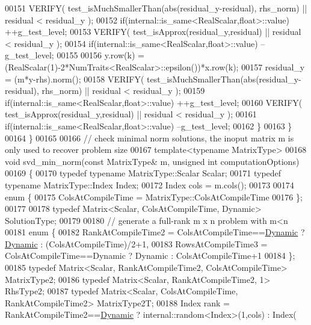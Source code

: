 \begin{DoxyCode}
00151       VERIFY( test\_isMuchSmallerThan(abs(residual\_y-residual), rhs\_norm) || residual < residual\_y );
00152       \textcolor{keywordflow}{if}(internal::is\_same<RealScalar,float>::value) ++g\_test\_level;
00153       VERIFY( test\_isApprox(residual\_y,residual) || residual < residual\_y );
00154       \textcolor{keywordflow}{if}(internal::is\_same<RealScalar,float>::value) --g\_test\_level;
00155       
00156       y.row(k) = (RealScalar(1)-2*NumTraits<RealScalar>::epsilon())*x.row(k);
00157       residual\_y = (m*y-rhs).norm();
00158       VERIFY( test\_isMuchSmallerThan(abs(residual\_y-residual), rhs\_norm) || residual < residual\_y );
00159       \textcolor{keywordflow}{if}(internal::is\_same<RealScalar,float>::value) ++g\_test\_level;
00160       VERIFY( test\_isApprox(residual\_y,residual) || residual < residual\_y );
00161       \textcolor{keywordflow}{if}(internal::is\_same<RealScalar,float>::value) --g\_test\_level;
00162     \}
00163   \}
00164 \}
00165 
00166 \textcolor{comment}{// check minimal norm solutions, the inoput matrix m is only used to recover problem size}
00167 \textcolor{keyword}{template}<\textcolor{keyword}{typename} MatrixType>
00168 \textcolor{keywordtype}{void} svd\_min\_norm(\textcolor{keyword}{const} MatrixType& m, \textcolor{keywordtype}{unsigned} \textcolor{keywordtype}{int} computationOptions)
00169 \{
00170   \textcolor{keyword}{typedef} \textcolor{keyword}{typename} MatrixType::Scalar Scalar;
00171   \textcolor{keyword}{typedef} \textcolor{keyword}{typename} MatrixType::Index Index;
00172   Index cols = m.cols();
00173 
00174   \textcolor{keyword}{enum} \{
00175     ColsAtCompileTime = MatrixType::ColsAtCompileTime
00176   \};
00177 
00178   \textcolor{keyword}{typedef} Matrix<Scalar, ColsAtCompileTime, Dynamic> SolutionType;
00179 
00180   \textcolor{comment}{// generate a full-rank m x n problem with m<n}
00181   \textcolor{keyword}{enum} \{
00182     RankAtCompileTime2 = ColsAtCompileTime==\hyperlink{namespace_eigen_ad81fa7195215a0ce30017dfac309f0b2}{Dynamic} ? \hyperlink{namespace_eigen_ad81fa7195215a0ce30017dfac309f0b2}{Dynamic} : (ColsAtCompileTime)/2+1,
00183     RowsAtCompileTime3 = ColsAtCompileTime==Dynamic ? Dynamic : ColsAtCompileTime+1
00184   \};
00185   \textcolor{keyword}{typedef} Matrix<Scalar, RankAtCompileTime2, ColsAtCompileTime> MatrixType2;
00186   \textcolor{keyword}{typedef} Matrix<Scalar, RankAtCompileTime2, 1> RhsType2;
00187   \textcolor{keyword}{typedef} Matrix<Scalar, ColsAtCompileTime, RankAtCompileTime2> MatrixType2T;
00188   Index rank = RankAtCompileTime2==\hyperlink{namespace_eigen_ad81fa7195215a0ce30017dfac309f0b2}{Dynamic} ? internal::random<Index>(1,cols) : Index(

\end{DoxyCode}
